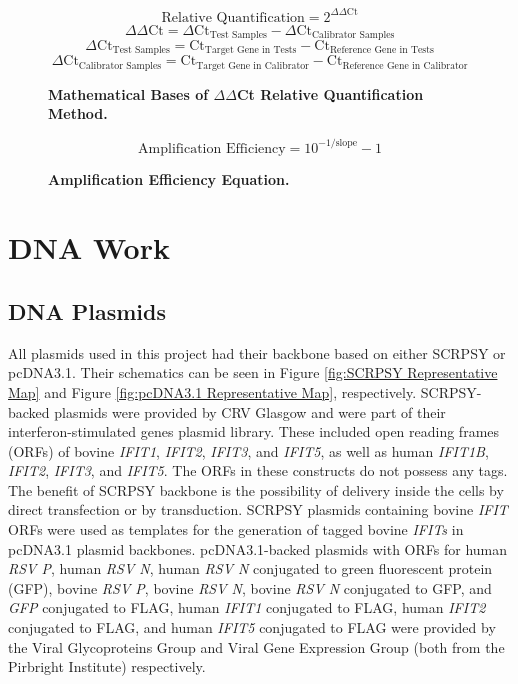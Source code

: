 \begin{figure}
$$\mbox{Relative Quantification} = 2^{\Delta\Delta \mbox{Ct}}$$
$$\Delta\Delta \mbox{Ct} = \Delta \mbox{Ct}_{\mbox{Test Samples}}-\Delta \mbox{Ct}_{\mbox{Calibrator Samples}}$$
$$\Delta \mbox{Ct}_{\mbox{Test Samples}} = \mbox{Ct}_{\mbox{Target Gene in Tests}}-\mbox{Ct}_{\mbox{Reference Gene in Tests}}$$
$$\Delta \mbox{Ct}_{\mbox{Calibrator Samples}} = \mbox{Ct}_{\mbox{Target Gene in Calibrator}}-\mbox{Ct}_{\mbox{Reference Gene in Calibrator}}$$
\caption[Mathematical Bases of $\Delta\Delta$Ct Relative Quantification Method.]{\textbf{Mathematical Bases of $\Delta\Delta$Ct Relative Quantification Method.}}
\label{eq:Mathematical Bases of delta delta Ct Relative Quantification Method}
\end{figure}

\begin{figure}
$$\mbox{Amplification Efficiency} = 10^{-1/\mbox{slope}}-1$$
\caption[Amplification Efficiency Equation.]{\textbf{Amplification Efficiency Equation.}}
\label{eq:Amplification Efficiency Equation}
\end{figure}

\section{DNA Work} \label{sec:DNA Work}
\subsection{DNA Plasmids} \label{subsec:DNA Plasmids}
All plasmids used in this project had their backbone based on either SCRPSY or pcDNA3.1. Their schematics can be seen in Figure \ref{fig:SCRPSY Representative Map} and Figure \ref{fig:pcDNA3.1 Representative Map}, respectively. SCRPSY-backed plasmids were provided by CRV Glasgow and were part of their interferon-stimulated genes plasmid library. These included open reading frames (ORFs) of bovine \textit{IFIT1}, \textit{IFIT2}, \textit{IFIT3}, and \textit{IFIT5}, as well as human \textit{IFIT1B}, \textit{IFIT2}, \textit{IFIT3}, and \textit{IFIT5}. The ORFs in these constructs do not possess any tags. The benefit of SCRPSY backbone is the possibility of delivery inside the cells by direct transfection or by transduction. SCRPSY plasmids containing bovine \textit{IFIT} ORFs were used as templates for the generation of tagged bovine \textit{IFITs} in pcDNA3.1 plasmid backbones. pcDNA3.1-backed plasmids with ORFs for human \textit{RSV P}, human \textit{RSV N}, human \textit{RSV N} conjugated to green fluorescent protein (GFP), bovine \textit{RSV P}, bovine \textit{RSV N}, bovine \textit{RSV N} conjugated to GFP, and \textit{GFP} conjugated to FLAG, human \textit{IFIT1} conjugated to FLAG, human \textit{IFIT2} conjugated to FLAG, and human \textit{IFIT5} conjugated to FLAG were provided by the Viral Glycoproteins Group and Viral Gene Expression Group (both from the Pirbright Institute) respectively.

